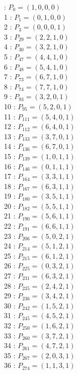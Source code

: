 \documentclass{article}
\begin{document}
{\begin{multicols}{3}
 : $P_{0}=( 1, 0, 0, 0 )$\\
1 : $P_{1}=( 0, 1, 0, 0 )$\\
2 : $P_{3}=( 0, 0, 0, 1 )$\\
3 : $P_{29}=( 2, 2, 1, 0 )$\\
4 : $P_{30}=( 3, 2, 1, 0 )$\\
5 : $P_{47}=( 4, 4, 1, 0 )$\\
6 : $P_{48}=( 5, 4, 1, 0 )$\\
7 : $P_{73}=( 6, 7, 1, 0 )$\\
8 : $P_{74}=( 7, 7, 1, 0 )$\\
9 : $P_{93}=( 3, 2, 0, 1 )$\\
10 : $P_{95}=( 5, 2, 0, 1 )$\\
11 : $P_{111}=( 5, 4, 0, 1 )$\\
12 : $P_{112}=( 6, 4, 0, 1 )$\\
13 : $P_{133}=( 3, 7, 0, 1 )$\\
14 : $P_{136}=( 6, 7, 0, 1 )$\\
15 : $P_{139}=( 1, 0, 1, 1 )$\\
16 : $P_{146}=( 0, 1, 1, 1 )$\\
17 : $P_{164}=( 3, 3, 1, 1 )$\\
18 : $P_{167}=( 6, 3, 1, 1 )$\\
19 : $P_{180}=( 3, 5, 1, 1 )$\\
20 : $P_{182}=( 5, 5, 1, 1 )$\\
21 : $P_{190}=( 5, 6, 1, 1 )$\\
22 : $P_{191}=( 6, 6, 1, 1 )$\\
23 : $P_{206}=( 5, 0, 2, 1 )$\\
24 : $P_{214}=( 5, 1, 2, 1 )$\\
25 : $P_{215}=( 6, 1, 2, 1 )$\\
26 : $P_{225}=( 0, 3, 2, 1 )$\\
27 : $P_{231}=( 6, 3, 2, 1 )$\\
28 : $P_{235}=( 2, 4, 2, 1 )$\\
29 : $P_{236}=( 3, 4, 2, 1 )$\\
30 : $P_{242}=( 1, 5, 2, 1 )$\\
31 : $P_{245}=( 4, 5, 2, 1 )$\\
32 : $P_{250}=( 1, 6, 2, 1 )$\\
33 : $P_{260}=( 3, 7, 2, 1 )$\\
34 : $P_{261}=( 4, 7, 2, 1 )$\\
35 : $P_{267}=( 2, 0, 3, 1 )$\\
36 : $P_{274}=( 1, 1, 3, 1 )$\\

\end{multicols}}
\end{document}
